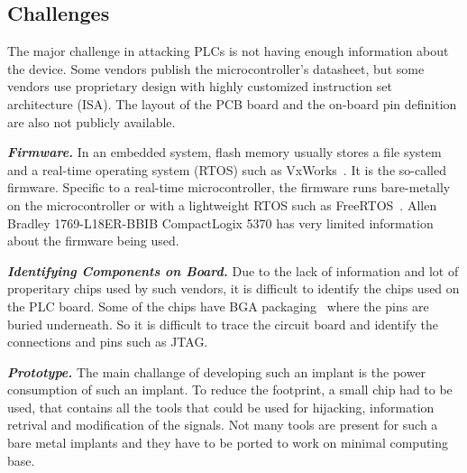 \subsection{Challenges}

The major challenge in attacking PLCs is not having enough information about the device. Some vendors publish the microcontroller's datasheet, but some vendors use proprietary design with highly customized instruction set architecture (ISA).  The layout of the PCB board and the on-board pin definition are also not publicly available.


\textbf{\textit{Firmware.}} In an embedded system, flash memory usually stores a file system and a real-time operating system (RTOS) such as VxWorks~\cite{neugass1991vxworks}. It is the so-called firmware. Specific to a real-time microcontroller, the firmware runs bare-metally on the microcontroller or with a lightweight RTOS such as FreeRTOS~\cite{barry2008freertos}. Allen Bradley 1769-L18ER-BBIB CompactLogix 5370 has very limited information about the firmware being used. 

\textbf{\textit{Identifying Components on Board.}} Due to the lack of information and lot of properitary chips used by such vendors, it is difficult to identify the chips used on the PLC board. Some of the chips have BGA packaging~\cite{joshi2000mosfet} where the pins are buried underneath. So it is difficult to trace the circuit board and identify the connections and pins such as JTAG. 

\textbf{\textit{Prototype.}} The main challange of developing such an implant is the power consumption of such an implant. To reduce the footprint, a small chip had to be used, that contains all the tools that could be used for hijacking, information retrival and modification of the signals. Not many tools are present for such a bare metal implants and they have to be ported to work on minimal computing base.   
